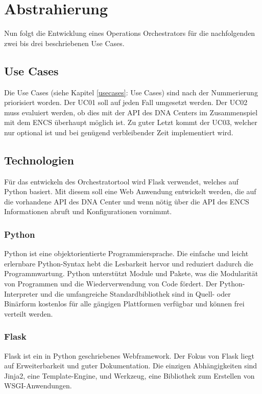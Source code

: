 \section{Abstrahierung}
Nun folgt die Entwicklung eines Operations Orchestrators für die nachfolgenden zwei bis drei beschriebenen Use Cases.

\subsection{Use Cases} 
Die Use Cases (siehe Kapitel \ref{usecases}: Use Cases) sind nach der Nummerierung priorisiert worden. Der UC01 soll auf jeden Fall umgesetzt werden. Der UC02 muss evaluiert werden, ob dies mit der API des DNA Centers im Zusammenspiel mit dem ENCS überhaupt möglich ist. Zu guter Letzt kommt der UC03, welcher nur optional ist und bei genügend verbleibender Zeit implementiert wird.


\subsection{Technologien}
Für das entwickeln des Orchestratortool wird Flask verwendet, welches auf Python basiert. Mit diesem soll eine Web Anwendung entwickelt werden, die auf die vorhandene API des DNA Center und wenn nötig über die API des ENCS Informationen abruft und Konfigurationen vornimmt.

\subsubsection{Python}
Python ist eine objektorientierte Programmiersprache. Die einfache und leicht erlernbare Python-Syntax hebt die Lesbarkeit hervor und reduziert dadurch die Programmwartung. Python unterstützt Module und Pakete, was die Modularität von Programmen und die Wiederverwendung von Code fördert. Der Python-Interpreter und die umfangreiche Standardbibliothek sind in Quell- oder Binärform kostenlos für alle gängigen Plattformen verfügbar und können frei verteilt werden. \cite{python}

\subsubsection{Flask}
Flask ist ein in Python geschriebenes Webframework. Der Fokus von Flask liegt auf Erweiterbarkeit und guter Dokumentation. Die einzigen Abhängigkeiten sind Jinja2, eine Template-Engine, und Werkzeug, eine Bibliothek zum Erstellen von WSGI-Anwendungen. \cite{flask}

